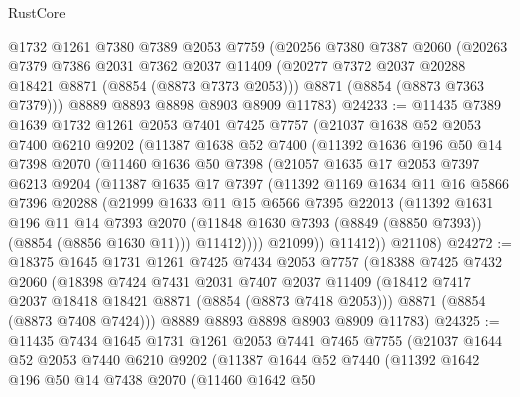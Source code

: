 \begin{lexlean}{RustCore}
\begin{coremodule}
    @1732
    @1261
    @7380
    @7389
    @2053
    @7759
    (@20256
      @7380
      @7387
      @2060
      (@20263
        @7379
        @7386
        @2031
        @7362
        @2037
        @11409
        (@20277 @7372 @2037 @20288 @18421 @8871 (@8854 (@8873 @7373 @2053)))
        @8871
        (@8854 (@8873 @7363 @7379)))
      @8889
      @8893
      @8898
      @8903
      @8909
      @11783)
@24233 := @11435
    @7389
    @1639
    @1732
    @1261
    @2053
    @7401
    @7425
    @7757
    (@21037
      @1638
      @52
      @2053
      @7400
      @6210
      @9202
      (@11387
        @1638
        @52
        @7400
        (@11392
          @1636
          @196
          @50
          @14
          @7398
          @2070
          (@11460
            @1636
            @50
            @7398
            (@21057
              @1635
              @17
              @2053
              @7397
              @6213
              @9204
              (@11387
                @1635
                @17
                @7397
                (@11392
                  @1169
                  @1634
                  @11
                  @16
                  @5866
                  @7396
                  @20288
                  (@21999
                    @1633
                    @11
                    @15
                    @6566
                    @7395
                    @22013
                    (@11392
                      @1631
                      @196
                      @11
                      @14
                      @7393
                      @2070
                      (@11848 @1630 @7393 (@8849 (@8850 @7393)) (@8854 (@8856 @1630 @11)))
                      @11412))))
              @21099))
          @11412))
      @21108)
@24272 := @18375
    @1645
    @1731
    @1261
    @7425
    @7434
    @2053
    @7757
    (@18388
      @7425
      @7432
      @2060
      (@18398
        @7424
        @7431
        @2031
        @7407
        @2037
        @11409
        (@18412 @7417 @2037 @18418 @18421 @8871 (@8854 (@8873 @7418 @2053)))
        @8871
        (@8854 (@8873 @7408 @7424)))
      @8889
      @8893
      @8898
      @8903
      @8909
      @11783)
@24325 := @11435
    @7434
    @1645
    @1731
    @1261
    @2053
    @7441
    @7465
    @7755
    (@21037
      @1644
      @52
      @2053
      @7440
      @6210
      @9202
      (@11387
        @1644
        @52
        @7440
        (@11392
          @1642
          @196
          @50
          @14
          @7438
          @2070
          (@11460
            @1642
            @50

\end{coremodule}
\end{lexlean}
